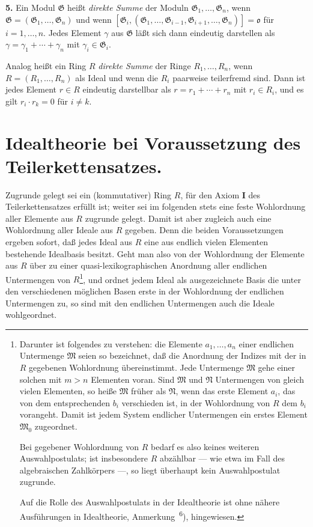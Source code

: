 \documentclass[12pt,a4paper]{article}
\newcommand{\fG}{\mathfrak{G}}
\theoremstyle{plain}
\theoremstyle{definition}
\theoremstyle{remark}
\begin{document}
\medskip
\noindent
\textbf{5.} Ein Modul $\fG$ heißt \textit{direkte Summe} der Moduln $\fG_{1},\dots,\fG_{n}$, wenn $\fG = (\fG_{1},\dots,\fG_{n})$ und wenn $[\fG_{i}, (\fG_{1},\dots,\fG_{i-1},\fG_{i+1},\dots,\fG_{n})] = \mathfrak{o}$ für $i = 1,\dots,n$. Jedes Element $\gamma$ aus $\fG$ läßt sich dann eindeutig darstellen als $\gamma = \gamma_{1} + \cdots + \gamma_{n}$ mit $\gamma_{i} \in \fG_{i}$.

Analog heißt ein Ring $R$ \textit{direkte Summe} der Ringe $R_{1},\dots,R_{n}$, wenn $R = (R_{1},\dots,R_{n})$ als Ideal und wenn die $R_{i}$ paarweise teilerfremd sind. Dann ist jedes Element $r \in R$ eindeutig darstellbar als $r = r_{1} + \cdots + r_{n}$ mit $r_{i} \in R_{i}$, und es gilt $r_{i} \cdot r_{k} = 0$ für $i \neq k$.

\newpage
\section{Idealtheorie bei Voraussetzung des Teilerkettensatzes.}

\noindent
Zugrunde gelegt sei ein (kommutativer) Ring $R$, für den Axiom \textbf{I} des Teilerkettensatzes erfüllt ist; weiter sei im folgenden stets eine feste Wohlordnung aller Elemente aus $R$ zugrunde gelegt. Damit ist aber zugleich auch eine Wohlordnung aller Ideale aus $R$ gegeben. Denn die beiden Voraussetzungen ergeben sofort, daß jedes Ideal aus $R$ eine aus endlich vielen Elementen bestehende Idealbasis besitzt. Geht man also von der Wohlordnung der Elemente aus $R$ über zu einer quasi-lexikographischen Anordnung aller endlichen Untermengen von $R$\footnote{Darunter ist folgendes zu verstehen: die Elemente $a_{1},\dots,a_{n}$ einer endlichen Untermenge $\mathfrak{M}$ seien so bezeichnet, daß die Anordnung der Indizes mit der in $R$ gegebenen Wohlordnung übereinstimmt. Jede Untermenge $\mathfrak{M}$ gehe einer solchen mit $m > n$ Elementen voran. Sind $\mathfrak{M}$ und $\mathfrak{N}$ Untermengen von gleich vielen Elementen, so heiße $\mathfrak{M}$ früher als $\mathfrak{N}$, wenn das erste Element $a_{i}$, das von dem entsprechenden $b_{i}$ verschieden ist, in der Wohlordnung von $R$ dem $b_{i}$ vorangeht. Damit ist jedem System endlicher Untermengen ein erstes Element $\mathfrak{M}_{0}$ zugeordnet.

Bei gegebener Wohlordnung von $R$ bedarf es also keines weiteren Auswahlpostulats; ist insbesondere $R$ abzählbar --- wie etwa im Fall des algebraischen Zahlkörpers ---, so liegt überhaupt kein Auswahlpostulat zugrunde.

Auf die Rolle des Auswahlpostulats in der Idealtheorie ist ohne nähere Ausführungen in Idealtheorie, Anmerkung\ \textsuperscript{6}), hingewiesen.}, und ordnet jedem Ideal als ausgezeichnete Basis die unter den verschiedenen möglichen Basen erste in der Wohlordnung der endlichen Untermengen zu, so sind mit den endlichen Untermengen auch die Ideale wohlgeordnet.
\end{document}
